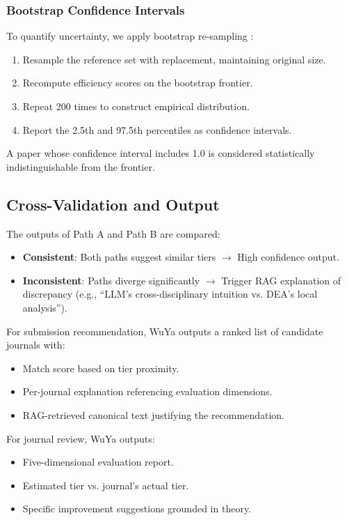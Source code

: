 \subsubsection{Bootstrap Confidence Intervals}

To quantify uncertainty, we apply bootstrap re-sampling \citep{efron1994introduction}:

\begin{enumerate}
    \item Resample the reference set with replacement, maintaining original size.
    \item Recompute efficiency scores on the bootstrap frontier.
    \item Repeat 200 times to construct empirical distribution.
    \item Report the 2.5th and 97.5th percentiles as confidence intervals.
\end{enumerate}

A paper whose confidence interval includes 1.0 is considered statistically indistinguishable from the frontier.

\subsection{Cross-Validation and Output}

The outputs of Path A and Path B are compared:

\begin{itemize}
    \item \textbf{Consistent}: Both paths suggest similar tiers $\rightarrow$ High confidence output.
    \item \textbf{Inconsistent}: Paths diverge significantly $\rightarrow$ Trigger RAG explanation of discrepancy (e.g., ``LLM's cross-disciplinary intuition vs. DEA's local analysis'').
\end{itemize}

For submission recommendation, WuYa outputs a ranked list of candidate journals with:
\begin{itemize}
    \item Match score based on tier proximity.
    \item Per-journal explanation referencing evaluation dimensions.
    \item RAG-retrieved canonical text justifying the recommendation.
\end{itemize}

For journal review, WuYa outputs:
\begin{itemize}
    \item Five-dimensional evaluation report.
    \item Estimated tier vs. journal's actual tier.
    \item Specific improvement suggestions grounded in theory.
\end{itemize}
